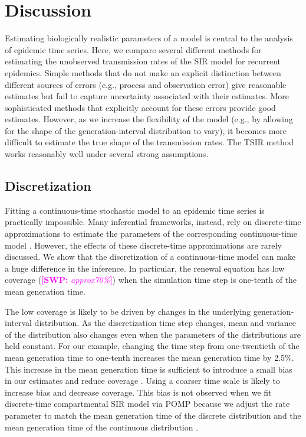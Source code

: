 \documentclass{article}
\newcommand{\comment}[3]{\textcolor{#1}{\textbf{[#2: }\textsl{#3}\textbf{]}}}
\newcommand{\swp}[1]{\comment{magenta}{SWP}{#1}}
\begin{document}
\section{Discussion}

Estimating biologically realistic parameters of a model is central to the analysis of epidemic time series.
Here, we compare several different methods for estimating the unobserved transmission rates of the SIR model for recurrent epidemics.
Simple methods that do not make an explicit distinction between different sources of errors (e.g., process and observation error) give reasonable estimates but fail to capture uncertainty associated with their estimates.
More sophisticated methods that explicitly account for these errors provide good estimates.
However, as we increase the flexibility of the model (e.g., by allowing for the shape of the generation-interval distribution to vary), it becomes more difficult to estimate the true shape of the transmission rates.
The TSIR method works reasonably well under several strong assumptions.

\subsection{Discretization}

Fitting a continuous-time stochastic model to an epidemic time series is practically impossible.
Many inferential frameworks, instead, rely on discrete-time approximations to estimate the parameters of the corresponding continuous-time model \citep{finkenstadt2002stochastic, king2015statistical, champredon2018two, li2018fitting}.
However, the effects of these discrete-time approximations are rarely discussed.
We show that the discretization of a continuous-time model can make a huge difference in the inference.
In particular, the renewal equation has low coverage (\swp{approx70\%}) when the simulation time step is one-tenth of the mean generation time.

The low coverage is likely to be driven by changes in the underlying generation-interval distribution.
As the discretization time step changes, mean and variance of the distribution also changes even when the parameters of the distributions are held constant.
For our example, changing the time step from one-twentieth of the mean generation time to one-tenth increases the mean generation time by 2.5\%.
This increase in the mean generation time is sufficient to introduce a small bias in our estimates and reduce coverage \citep{wallinga2006generation}.
Using a coarser time scale is likely to increase bias and decrease coverage.
This bias is not observed when we fit discrete-time compartmental SIR model via POMP because we adjust the rate parameter to match the mean generation time of the discrete distribution and the mean generation time of the continuous distribution \citep{he2009plug}.
\end{document}
